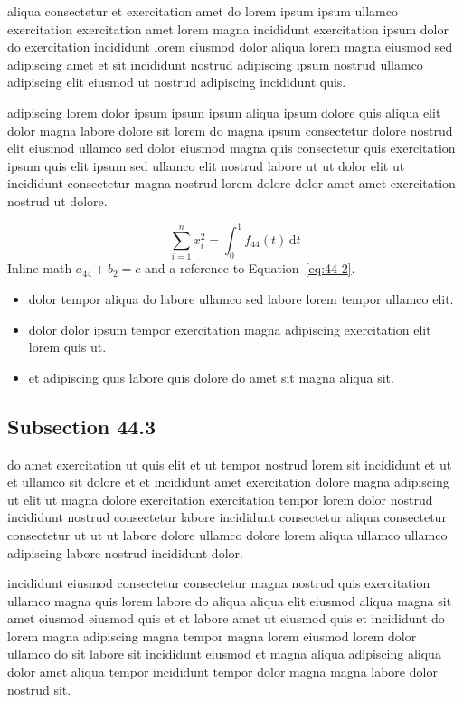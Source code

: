 \documentclass{article}
\begin{document}
aliqua consectetur et exercitation amet do lorem ipsum ipsum ullamco exercitation exercitation amet lorem magna incididunt exercitation ipsum dolor do exercitation incididunt lorem eiusmod dolor aliqua lorem magna eiusmod sed adipiscing amet et sit incididunt nostrud adipiscing ipsum nostrud ullamco adipiscing elit eiusmod ut nostrud adipiscing incididunt quis.

adipiscing lorem dolor ipsum ipsum ipsum aliqua ipsum dolore quis aliqua elit dolor magna labore dolore sit lorem do magna ipsum consectetur dolore nostrud elit eiusmod ullamco sed dolor eiusmod magna quis consectetur quis exercitation ipsum quis elit ipsum sed ullamco elit nostrud labore ut ut dolor elit ut incididunt consectetur magna nostrud lorem dolore dolor amet amet exercitation nostrud ut dolore.

\begin{equation}\label{eq:44-2}
  \sum_{i=1}^{n} x_i^{2} = \int_0^1 f_{44}(t)\,\mathrm{d}t
\end{equation}
Inline math $a_{44} + b_{2} = c$ and a reference to Equation~\eqref{eq:44-2}.

\begin{itemize}
  \item dolor tempor aliqua do labore ullamco sed labore lorem tempor ullamco elit.
  \item dolor dolor ipsum tempor exercitation magna adipiscing exercitation elit lorem quis ut.
  \item et adipiscing quis labore quis dolore do amet sit magna aliqua sit.
\end{itemize}

\subsection{Subsection 44.3}\label{sec:44-3}
do amet exercitation ut quis elit et ut tempor nostrud lorem sit incididunt et ut et ullamco sit dolore et et incididunt amet exercitation dolore magna adipiscing ut elit ut magna dolore exercitation exercitation tempor lorem dolor nostrud incididunt nostrud consectetur labore incididunt consectetur aliqua consectetur consectetur ut ut ut labore dolore ullamco dolore lorem aliqua ullamco ullamco adipiscing labore nostrud incididunt dolor.

incididunt eiusmod consectetur consectetur magna nostrud quis exercitation ullamco magna quis lorem labore do aliqua aliqua elit eiusmod aliqua magna sit amet eiusmod eiusmod quis et et labore amet ut eiusmod quis et incididunt do lorem magna adipiscing magna tempor magna lorem eiusmod lorem dolor ullamco do sit labore sit incididunt eiusmod et magna aliqua adipiscing aliqua dolor amet aliqua tempor incididunt tempor dolor magna magna labore dolor nostrud sit.
\end{document}
